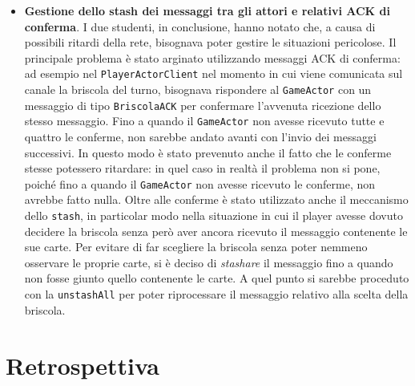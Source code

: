 \begin {itemize}
        \item \textbf{Gestione dello stash dei messaggi tra gli attori e relativi ACK di conferma}. I due studenti, in conclusione, hanno notato che, a causa di possibili ritardi della rete, bisognava poter gestire le situazioni pericolose. Il principale problema è stato arginato utilizzando messaggi ACK di conferma: ad esempio nel \texttt{PlayerActorClient} nel momento in cui viene comunicata sul canale la briscola del turno, bisognava rispondere al \texttt{GameActor} con un messaggio di tipo \texttt{BriscolaACK} per confermare l'avvenuta ricezione dello stesso messaggio. Fino a quando il \texttt{GameActor} non avesse ricevuto tutte e quattro le conferme, non sarebbe andato avanti con l'invio dei messaggi successivi. In questo modo è stato prevenuto anche il fatto che le conferme stesse potessero ritardare: in quel caso in realtà il problema non si pone, poiché fino a quando il \texttt{GameActor} non avesse ricevuto le conferme, non avrebbe fatto nulla. Oltre alle conferme è stato utilizzato anche il meccanismo dello \texttt{stash}, in particolar modo nella situazione in cui il player avesse dovuto decidere la briscola senza però aver ancora ricevuto il messaggio contenente le sue carte. Per evitare di far scegliere la briscola senza poter nemmeno osservare le proprie carte, si è deciso di \textit{stashare} il messaggio fino a quando non fosse giunto quello contenente le carte. A quel punto si sarebbe proceduto con la \texttt{unstashAll} per poter riprocessare il messaggio relativo alla scelta della briscola.
   	\end {itemize}
        
        \clearpage
        
    \section{Retrospettiva}\label{sec:retrospective}


